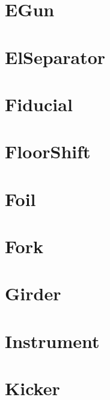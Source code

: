 \section{EGun}
\label{s:egun}


\section{ElSeparator}
\label{s:elsep}


\section{Fiducial}
\label{s:fiducial}


\section{FloorShift}
\label{s:floorshift}


\section{Foil}
\label{s:foil}


\section{Fork}
\label{s:fork}


\section{Girder}
\label{s:girder}


\section{Instrument}
\label{s:instrument}


\section{Kicker}
\label{s:kicker}


